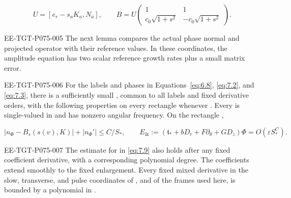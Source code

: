 \begin{equation}
U=[e_r-s_aK_a,N_a],\qquad
B=U
\begin{pmatrix}
1&1\\
c_0\sqrt{1+s^2}&-c_0\sqrt{1+s^2}
\end{pmatrix}.
\tag{7.8}\label{eq:7.8}
\end{equation}
\begin{EESegment}{EE-TGT-P075-005}
The next lemma compares the actual phase normal and projected operator with their reference values. In these coordinates, the amplitude equation has two scalar reference growth rates plus a small matrix error.
\end{EESegment}

\begin{lemma}\label{lem:7.1}
\begin{EESegment}{EE-TGT-P075-006}
For the labels and phases in Equations~\eqref{eq:6.8}, \eqref{eq:7.2}, and \eqref{eq:7.3}, there is a sufficiently small , common to all labels and fixed derivative orders, with the following properties on every rectangle whenever . Every  is single-valued in  and has nonzero angular frequency. On the rectangle ,
\end{EESegment}
\begin{equation}
|n_\Phi-B_s(s(v),K)|+|n_\Phi'|\leq C/S_*,
\qquad
E_{\mathrm{ik}}:=(\mathfrak t_*+bD_r+F\partial_\theta+GD_z)\Phi=O(\varepsilon S_*^C).
\tag{7.9}\label{eq:7.9}
\end{equation}
\begin{EESegment}{EE-TGT-P075-007}
The estimate for  in \eqref{eq:7.9} also holds after any fixed coefficient derivative, with a corresponding polynomial degree. The coefficients extend smoothly to the fixed enlargement. Every fixed mixed derivative in the slow, transverse, and pulse coordinates of , and of the frames used here, is bounded by a polynomial in .
\end{EESegment}


\end{lemma}
